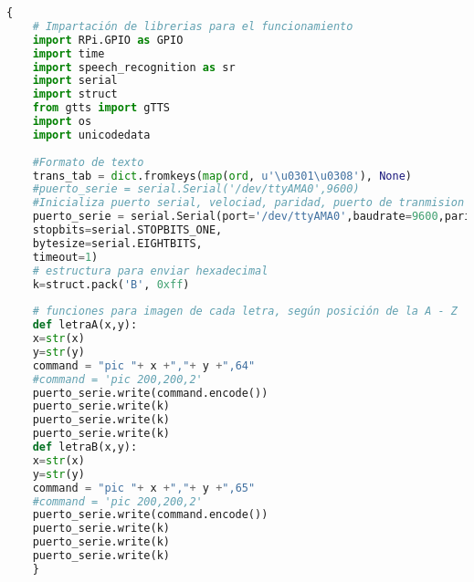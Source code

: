 \documentclass[12pt,a4paper]{article}
\begin{document}
	\begin{lstlisting}[language=Python]
	{
	# Impartación de librerias para el funcionamiento
	import RPi.GPIO as GPIO
	import time
	import speech_recognition as sr
	import serial
	import struct
	from gtts import gTTS
	import os
	import unicodedata
	
	#Formato de texto
	trans_tab = dict.fromkeys(map(ord, u'\u0301\u0308'), None)
	#puerto_serie = serial.Serial('/dev/ttyAMA0',9600)
	#Inicializa puerto serial, velociad, paridad, puerto de tranmision raspberry
	puerto_serie = serial.Serial(port='/dev/ttyAMA0',baudrate=9600,parity=serial.PARITY_NONE,
	stopbits=serial.STOPBITS_ONE,
	bytesize=serial.EIGHTBITS,
	timeout=1) 
	# estructura para enviar hexadecimal
	k=struct.pack('B', 0xff)
	
	# funciones para imagen de cada letra, según posición de la A - Z
	def letraA(x,y):
	x=str(x)
	y=str(y)
	command = "pic "+ x +","+ y +",64"
	#command = 'pic 200,200,2'
	puerto_serie.write(command.encode())
	puerto_serie.write(k)
	puerto_serie.write(k)
	puerto_serie.write(k)
	def letraB(x,y):
	x=str(x)
	y=str(y)
	command = "pic "+ x +","+ y +",65"
	#command = 'pic 200,200,2'
	puerto_serie.write(command.encode())
	puerto_serie.write(k)
	puerto_serie.write(k)
	puerto_serie.write(k)	
	}
\end{lstlisting}
	
\end{document}
